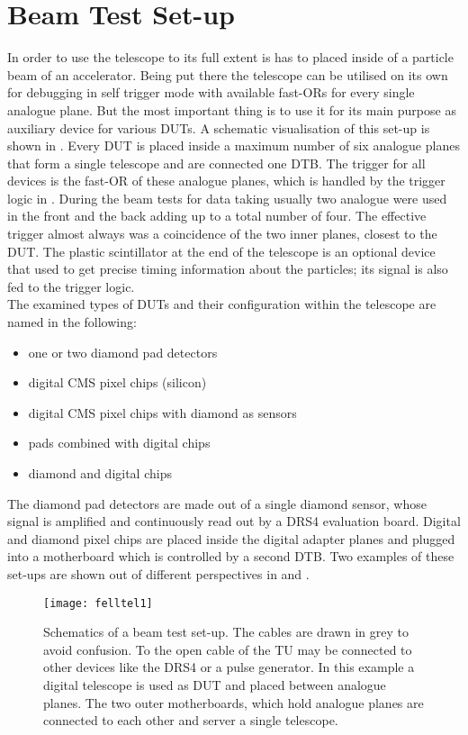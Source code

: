 \section{Beam Test Set-up}
In order to use the telescope to its full extent is has to placed inside of a particle beam of an accelerator. Being put there the telescope can be utilised on its own for debugging in self trigger mode with available fast-ORs for every single analogue plane. But the most important thing is to use it for its main purpose as auxiliary device for various \ac{DUT}s. A schematic visualisation of this set-up is shown in . Every \ac{DUT} is placed inside a maximum number of six analogue planes that form a single telescope and are connected one \ac{DTB}. The trigger for all devices is the fast-OR of these analogue planes, which is handled by the trigger logic in . During the beam tests for data taking usually two analogue were used in the front and the back adding up to a total number of four. The effective trigger almost always was a coincidence of the two inner planes, closest to the \ac{DUT}. The plastic scintillator at the end of the telescope is an optional device that used to get precise timing information about the particles; its signal is also fed to the trigger logic.\\
The examined types of \ac{DUT}s and their configuration within the telescope are named in the following:
\begin{itemize}
	\item one or two diamond pad detectors
	\item digital CMS pixel chips (silicon)
	\item digital CMS pixel chips with diamond as sensors
	\item pads combined with digital chips
	\item diamond and digital chips
\end{itemize}
The diamond pad detectors are made out of a single diamond sensor, whose signal is amplified and continuously read out by a DRS4 evaluation board. Digital and diamond pixel chips are placed inside the digital adapter planes and plugged into a motherboard which is controlled by a second \ac{DTB}. Two examples of these set-ups are shown out of different perspectives in  and .
\begin{figure}[ht]
	\centering
	\texttt{[image: felltel1]}
	\caption{Schematics of a beam test set-up. The cables are drawn in grey to avoid confusion. To the open cable of the \ac{TU} may be connected to other devices like the DRS4 or a pulse generator. In this example a digital telescope is used as \ac{DUT} and placed between analogue planes. The two outer motherboards, which hold analogue planes are connected to each other and server a single telescope.}
	\label{pfulldraw}
\end{figure}\no
